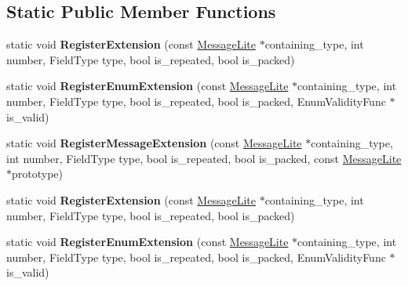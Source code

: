 \subsection*{Static Public Member Functions}
\begin{DoxyCompactItemize}
\item 
\mbox{\label{classgoogle_1_1protobuf_1_1internal_1_1ExtensionSet_a5de789111f7e26044f031462a95db16e}} 
static void {\bfseries Register\+Extension} (const \hyperlink{classgoogle_1_1protobuf_1_1MessageLite}{Message\+Lite} $\ast$containing\+\_\+type, int number, Field\+Type type, bool is\+\_\+repeated, bool is\+\_\+packed)
\item 
\mbox{\label{classgoogle_1_1protobuf_1_1internal_1_1ExtensionSet_a5f783834f19fb5b5d7535ac9d06e2cab}} 
static void {\bfseries Register\+Enum\+Extension} (const \hyperlink{classgoogle_1_1protobuf_1_1MessageLite}{Message\+Lite} $\ast$containing\+\_\+type, int number, Field\+Type type, bool is\+\_\+repeated, bool is\+\_\+packed, Enum\+Validity\+Func $\ast$is\+\_\+valid)
\item 
\mbox{\label{classgoogle_1_1protobuf_1_1internal_1_1ExtensionSet_aba3a6863d70cd1882fd543349aca1a50}} 
static void {\bfseries Register\+Message\+Extension} (const \hyperlink{classgoogle_1_1protobuf_1_1MessageLite}{Message\+Lite} $\ast$containing\+\_\+type, int number, Field\+Type type, bool is\+\_\+repeated, bool is\+\_\+packed, const \hyperlink{classgoogle_1_1protobuf_1_1MessageLite}{Message\+Lite} $\ast$prototype)
\item 
\mbox{\label{classgoogle_1_1protobuf_1_1internal_1_1ExtensionSet_a5d90b05ad8e15a13b74f74985c0d0211}} 
static void {\bfseries Register\+Extension} (const \hyperlink{classgoogle_1_1protobuf_1_1MessageLite}{Message\+Lite} $\ast$containing\+\_\+type, int number, Field\+Type type, bool is\+\_\+repeated, bool is\+\_\+packed)
\item 
\mbox{\label{classgoogle_1_1protobuf_1_1internal_1_1ExtensionSet_ab31d5b58ca16430e02385a6887eb672e}} 
static void {\bfseries Register\+Enum\+Extension} (const \hyperlink{classgoogle_1_1protobuf_1_1MessageLite}{Message\+Lite} $\ast$containing\+\_\+type, int number, Field\+Type type, bool is\+\_\+repeated, bool is\+\_\+packed, Enum\+Validity\+Func $\ast$is\+\_\+valid)

\end{DoxyCompactItemize}
